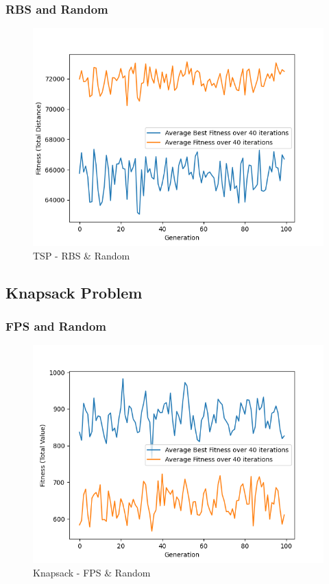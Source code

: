 \documentclass[11pt, letterpaper]{article}
\begin{document}
\subsubsection {RBS and Random}
\begin{figure}[H]
    \centering
    \includegraphics[scale = 0.6]{images/tsp_rb_rd.png}
    \caption {TSP - RBS \& Random}
    \label {fig:tpsRbR}
\end{figure}

\newpage

\subsection{Knapsack Problem}

\subsubsection {FPS and Random}
\begin{figure}[H]
    \centering
    \includegraphics[scale = 0.6]{images/knapsack_fp_rd.png}
    \caption {Knapsack - FPS \& Random}
    \label {fig:kpFR}
\end{figure}
\end{document}
